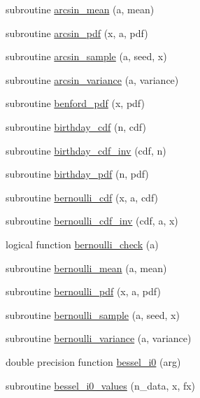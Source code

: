 \begin{DoxyCompactItemize}
\item 
subroutine \hyperlink{subroutines_8f_a0f3f6a9d53c5ee489f35b5aedd71c3e9}{arcsin\+\_\+mean} (a, mean)
\item 
subroutine \hyperlink{subroutines_8f_a370461195a0a6dbc81d1694f1c900521}{arcsin\+\_\+pdf} (x, a, pdf)
\item 
subroutine \hyperlink{subroutines_8f_af45217dbb90ff9bd690d7d87061616a9}{arcsin\+\_\+sample} (a, seed, x)
\item 
subroutine \hyperlink{subroutines_8f_aec7db221e74872bf1e854e0bd9bab771}{arcsin\+\_\+variance} (a, variance)
\item 
subroutine \hyperlink{subroutines_8f_a9fef702e6bf364a5f85533ca613a7d94}{benford\+\_\+pdf} (x, pdf)
\item 
subroutine \hyperlink{subroutines_8f_a2ef757fb4d120a7339e7ba2d6e4df537}{birthday\+\_\+cdf} (n, cdf)
\item 
subroutine \hyperlink{subroutines_8f_a8688523c630741866353afc455c7a5ee}{birthday\+\_\+cdf\+\_\+inv} (cdf, n)
\item 
subroutine \hyperlink{subroutines_8f_acae6886b34ec452abc19475c7905366b}{birthday\+\_\+pdf} (n, pdf)
\item 
subroutine \hyperlink{subroutines_8f_ab0c099a6932ebc7e4d4378e2bcebfb6a}{bernoulli\+\_\+cdf} (x, a, cdf)
\item 
subroutine \hyperlink{subroutines_8f_aba46047e0d6d0160e9e7f72f468fada8}{bernoulli\+\_\+cdf\+\_\+inv} (cdf, a, x)
\item 
logical function \hyperlink{subroutines_8f_ab60b2073960d9ea664fad920aaccfb29}{bernoulli\+\_\+check} (a)
\item 
subroutine \hyperlink{subroutines_8f_a0b4283a0687fb97d4b5e37594d3d960e}{bernoulli\+\_\+mean} (a, mean)
\item 
subroutine \hyperlink{subroutines_8f_a89fa5f5a4cbaa3ec07e13d430cdbb0b8}{bernoulli\+\_\+pdf} (x, a, pdf)
\item 
subroutine \hyperlink{subroutines_8f_ae46a4cd68c1ca43b8cd6149a3af3451c}{bernoulli\+\_\+sample} (a, seed, x)
\item 
subroutine \hyperlink{subroutines_8f_aac79468ade583fbf0b0faf3fab44bc96}{bernoulli\+\_\+variance} (a, variance)
\item 
double precision function \hyperlink{subroutines_8f_a56f2ab001fb7fd87fd8c17369a866f5a}{bessel\+\_\+i0} (arg)
\item 
subroutine \hyperlink{subroutines_8f_a0508ca5dc920b3b002ac4d769e9e7128}{bessel\+\_\+i0\+\_\+values} (n\+\_\+data, x, fx)
\item 

\end{DoxyCompactItemize}
